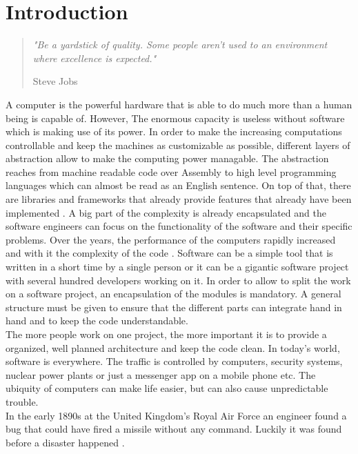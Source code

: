 \chapter{Introduction}

\begin{quote}
\centering 
\em %
"Be a yardstick of quality. Some people aren't used to an environment where excellence is expected."

\medskip
\raggedleft
Steve Jobs
\end{quote}
\vspace{10 mm}

A computer is the powerful hardware that is able to do much more than a human being is capable of. However, The enormous capacity is useless without software which is making use of its power. In order to make the increasing computations controllable and keep the machines as customizable as possible, different layers of abstraction allow to make the computing power managable. The abstraction reaches from machine readable code over Assembly to high level programming languages which can almost be read as an English sentence. On top of that, there are libraries and frameworks that already provide features that already have been implemented \cite{Martin:2008:CCH:1388398}. A big part of the complexity is already encapsulated and the software engineers can focus on the functionality of the software and their specific problems.
\bigbreak
Over the years, the performance of the computers rapidly increased and with it the complexity of the code \cite{wirth2008brief}.
Software can be a simple tool that is written in a short time by a single person or it can be a gigantic software project with several hundred developers working on it\cite{cusumano1997microsoft}.
In order to allow to split the work on a software project, an encapsulation of the modules is mandatory. A general structure must be given to ensure that the different parts can integrate hand in hand and to keep the code understandable.\\
The more people work on one project, the more important it is to provide a organized, well planned architecture and keep the code clean.
\bigbreak
In today's world, software is everywhere. The traffic is controlled by computers, security systems, nuclear power plants or just a messenger app on a mobile phone etc. 
The ubiquity of computers can make life easier, but can also cause unpredictable trouble.\\
In the early 1890s at the United Kingdom's Royal Air Force an engineer found a bug that could have fired a missile without any command. Luckily it was found before a disaster happened \cite{ross2005exterminators}.
